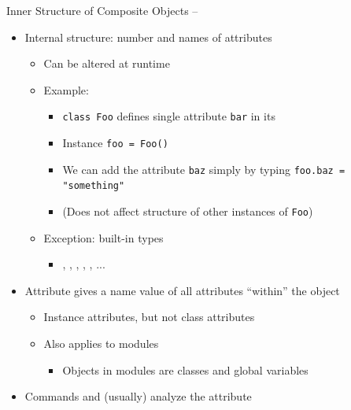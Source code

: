 
\begin{frame}[fragile]{Inner Structure of Composite Objects -- }
%
\begin{itemize}
\item Internal structure: number and names of attributes
	\begin{itemize}
	\item Can be altered at runtime
	\item Example:
		\begin{itemize}
		\item \texttt{class Foo} defines single attribute \texttt{bar} in its 
		\item Instance \texttt{foo = Foo()}
		\item We can add the attribute \texttt{baz} simply by typing \texttt{foo.baz = "something"}
		\item (Does not affect structure of other instances of \texttt{Foo})
		\end{itemize}
	\item Exception: built-in types
		\begin{itemize}
		\item {}, , , , , ...
		\end{itemize}
	\end{itemize}
\item Attribute  gives a  name \thus value of all attributes \enquote{within} the object
	\begin{itemize}
	\item Instance attributes, but not class attributes
	\item Also applies to modules
		\begin{itemize}
		\item Objects in modules are classes and global variables
		\end{itemize}
	\end{itemize}
\item Commands  and  (usually) analyze the  attribute
\end{itemize}
%
\end{frame}



